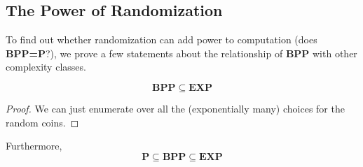   \subsection{The Power of Randomization}
  To find out whether randomization can add power to computation (does \textbf{BPP=P}?), we prove a few statements about the relationship of \textbf{BPP} with other complexity classes. 

  \begin{theorem}
    \label{thm:simulating-randomized-algorithms-in-exponential}
  \begin{equation}
    \mathbf{BPP \subseteq EXP}
  \end{equation}
  \end{theorem}
  \begin{proof}
  We can just enumerate over all the (exponentially many) choices for the random coins. 
  \end{proof}

  Furthermore, 
  \begin{equation}
    \mathbf{P \subseteq BPP \subseteq EXP}
  \end{equation}

